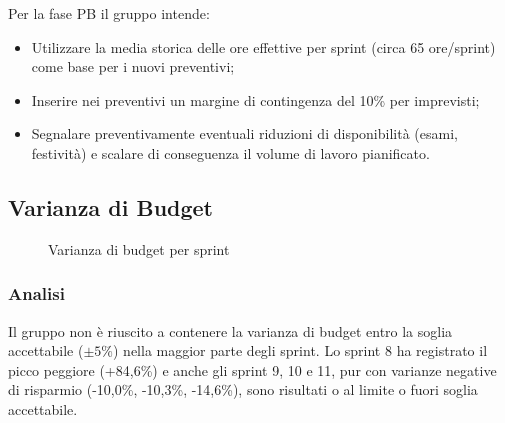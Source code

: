 \documentclass[a4paper,11pt,oneside]{scrartcl}
\begin{document}
Per la fase PB il gruppo intende:
\begin{itemize}
    \item Utilizzare la media storica delle ore effettive per sprint (circa 65 ore/sprint) come base per i nuovi preventivi;
    \item Inserire nei preventivi un margine di contingenza del 10\% per imprevisti;
    \item Segnalare preventivamente eventuali riduzioni di disponibilità (esami, festività) e scalare di conseguenza il volume di lavoro pianificato.
\end{itemize}

\subsection{Varianza di Budget}

\begin{figure}[H]
\centering
{}
\caption{Varianza di budget per sprint}
\label{fig:varianza_budget}
\end{figure}

\subsubsection*{Analisi}

Il gruppo non è riuscito a contenere la varianza di budget entro la soglia accettabile ($\pm 5\%$) nella maggior parte degli sprint. Lo sprint 8 ha registrato il picco peggiore (+84,6\%) e anche gli sprint 9, 10 e 11, pur con varianze negative di risparmio (-10,0\%, -10,3\%, -14,6\%), sono risultati o al limite o fuori soglia accettabile.
\end{document}
